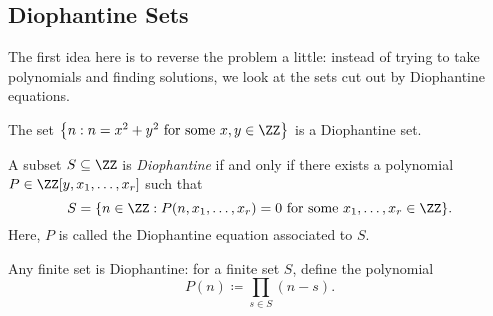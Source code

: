 \documentclass{article}
\begin{document}
\subsection{Diophantine Sets}
The first idea here is to reverse the problem a little: instead of trying to take polynomials and finding solutions, we look at the sets cut out by Diophantine equations.
\begin{example}
	The set $\left\{n:n=x^2+y^2\text{ for some }x,y\in\ZZ\right\}$ is a Diophantine set.
\end{example}
\begin{definition}[Diophantine]
	A subset $S\subseteq\ZZ$ is \textit{Diophantine} if and only if there exists a polynomial $P\in\ZZ[y,x_1,\ldots,x_r]$ such that
	\[S=\{n\in\ZZ:P(n,x_1,\ldots,x_r)=0\text{ for some }x_1,\ldots,x_r\in\ZZ\}.\]
	Here, $P$ is called the Diophantine equation associated to $S$.
\end{definition}
\begin{example}
	Any finite set is Diophantine: for a finite set $S$, define the polynomial
	\[P(n)\coloneqq\prod_{s\in S}(n-s).\]
\end{example}
\end{document}
